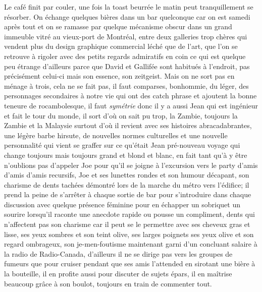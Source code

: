 \documentclass{article}
\begin{document}
Le café finit par couler, une fois la toast beurrée le matin peut tranquillement
se résorber. On échange quelques bières dans un bar quelconque car on est samedi
après tout et on se ramasse par quelque mécanisme obscur dans un grand immeuble
vitré au vieux-port de Montréal, entre deux galleries trop chères qui vendent
plus du design graphique commercial léché que de l'art, que l'on se retrouve à
rigoler avec des petits regards admiratifs en coin ce qui est quelque peu
étrange d'ailleurs parce que David et Gallifée sont habitués à l'endroit, pas
précisément celui-ci mais son essence, son zeitgeist. Mais on ne sort pas en
ménage à trois, cela ne se fait pas, il faut comparses, bonhommie, du léger, des
personnages secondaires à notre vie qui ont des catch phrase et ajoutent la
bonne teneure de rocambolesque, il faut \emph{symétrie} donc il y a aussi Jean
qui est ingénieur et fait le tour du monde, il sort d'où on sait pu trop, la
Zambie, toujours la Zambie et la Malaysie surtout d'où il revient avec ses
histoires abracadabrantes, une légère barbe hirsute, de nouvelles normes
culturelles et une nouvelle personnalité qui vient se graffer sur ce qu'était
Jean pré-nouveau voyage qui change toujours mais toujours grand et blond et
blanc, en fait tant qu'à y être n'oublions pas d'appeler Joe pour qu'il se
joigne à l'excursion vers le party d'amis d'amis d'amis recursifs, Joe et ses
lunettes rondes et son humour décapant, son charisme de dents tachées démontré
lors de la marche du métro vers l'édifice; il prend la peine de s'arrêter à
chaque sortie de bar pour s'introduire dans chaque discussion avec quelque
présence féminine pour en échapper un sobriquet un sourire lorsqu'il raconte une
anecdote rapide ou pousse un compliment, dents qui n'affectent pas son charisme
car il peut se le permettre avec ses cheveux gras et lisse, ses yeux sombres et
son teint olive, ses larges poignets ses yeux olive et son regard ombrageux, son
je-men-foutisme maintenant garni d'un concluant salaire à la radio de
Radio-Canada, d'ailleurs il ne se dirige pas vers les groupes de fumeurs que
pour cruiser pendant que ses amis l'attended en sirotant une bière à la
bouteille, il en profite aussi pour discuter de sujets épars, il en maîtrise
beaucoup grâce à son boulot, toujours en train de commenter tout.\\

\clearpage
\end{document}
